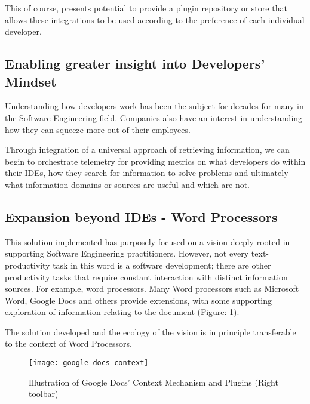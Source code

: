 This of course, presents potential to provide a plugin repository or store that allows these integrations to be used according to the preference of each individual developer.

\subsection{Enabling greater insight into Developers' Mindset}

Understanding how developers work has been the subject for decades for many in the Software Engineering field. Companies also have an interest in understanding how they can squeeze more out of their employees.

Through integration of a universal approach of retrieving information, we can begin to orchestrate telemetry for providing metrics on what developers do within their IDEs, how they search for information to solve problems and ultimately what information domains or sources are useful and which are not. 

\subsection{Expansion beyond IDEs - Word Processors}

This solution implemented has purposely focused on a vision deeply rooted in supporting Software Engineering practitioners. However, not every text-productivity task in this word is a software development; there are other productivity tasks that require constant interaction with distinct information sources. For example, word processors. Many Word processors such as Microsoft Word, Google Docs and others provide extensions, with some supporting exploration of information relating to the document (Figure: \ref{fig:google-docs-context}). 

The solution developed and the ecology of the vision is in principle transferable to the context of Word Processors.

\begin{figure}[h!]
	\centering
	\texttt{[image: google-docs-context]}
	\caption{Illustration of Google Docs' Context Mechanism and Plugins (Right toolbar)}
	\label{fig:google-docs-context}
\end{figure}

